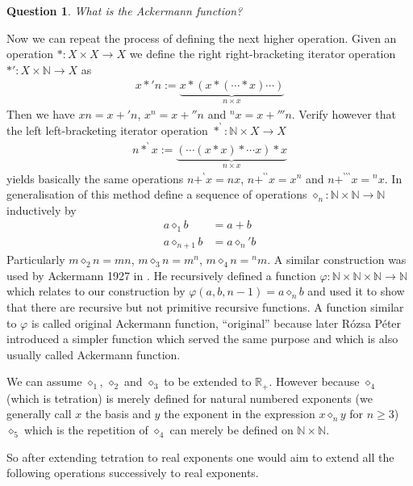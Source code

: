 \documentclass[12pt]{article}
\newtheorem{question}{Question}
\theoremstyle{definition}
\newcommand{\N}{\mathbb{N}}
\newcommand{\RP}{\mathbb{R}_+}
\newcommand{\ph}{\varphi}
\newcommand{\tet}[2]{{{}^{#2}{#1}}}
\begin{document}
\begin{question}
  What is the Ackermann function?
\end{question}
Now we can repeat the process of defining the next higher
operation. Given an operation $\ast\colon X\times X\to X$ we define
the right right-bracketing iterator operation $\ast'\colon X \times \N\to
X$ as 
\begin{align*}
  x\ast' n := \underbrace{x\ast (x \ast( \dotsb \ast x)\dotsb)}_{n\times x}
\end{align*}
Then we have $xn=x+'n$, $x^n=x+''n$ and $\tet{x}{n} = x+''' n$. Verify
however that the left left-bracketing iterator operation
$\ast^{\backprime}\colon \N\times X \to X$  
\begin{align*}
  n \ast^\backprime x:= \underbrace{(\dotsb(x\ast x)\ast \dotsb x)\ast
  x}_{n\times x}
\end{align*}
yields basically the same operations $n+^{\backprime}x=nx$,
$n+^{\backprime\backprime} x=x^n$ and
$n+^{\backprime\backprime\backprime} x=\tet{x}{n}$.
In generalisation of this method define a sequence of operations
$\diamond_n\colon\N\times\N\to\N$ inductively by
\begin{align*}
  a \diamond_1 b &= a+b\\
  a \diamond_{n+1} b &= a \diamond_{n}' b 
\end{align*}
Particularly $m\diamond_2 n=mn$, $m\diamond_3 n=m^n$, $m\diamond_4
n=\tet{m}{n}$.  A similar construction was used by Ackermann 1927 in
\cite{Ackermann:ReelleZahlen}. He recursively defined a function
$\ph\colon\N\times\N\times\N\to\N$ which relates to our construction
by $\ph(a,b,n-1)= a \diamond_{n} b$ and used it to show that there are
recursive but not primitive recursive functions. A function similar to
$\ph$ is called original Ackermann function, ``original'' because
later R\'ozsa P\'eter  
introduced a simpler function which served the same
purpose and which is also usually called Ackermann function.

We can assume $\diamond_1$, $\diamond_2$ and $\diamond_3$ to be
extended to $\RP$. However because $\diamond_4$ (which is tetration) is merely
defined for natural numbered exponents (we generally call $x$ the basis and $y$
the exponent in the expression $x\diamond_n y$ for $n\ge 3$)
$\diamond_5$ which is the repetition of $\diamond_4$ can merely be
defined on $\N\times\N$.

So after extending tetration to real exponents one would aim to extend
all the following operations successively to real exponents.
\end{document}
